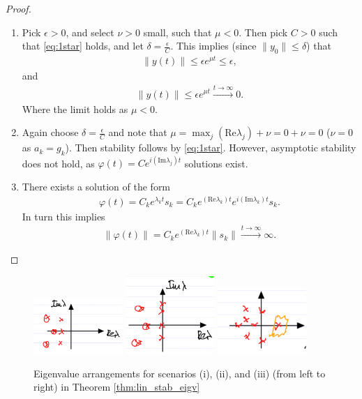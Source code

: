 \begin{proof}
	\begin{enumerate}
		\item Pick $\epsilon > 0$, and select $\nu > 0$ small, such that $\mu <0$. Then pick $C> 0$ such that \eqref{eq:1star} holds, and let $\delta = \frac{\epsilon}{C}$. This implies (since $\| {y} _0\| \leq \delta $) that
			\begin{align}
				\| {y} (t) \| \leq \epsilon e^{\mu t} \leq \epsilon,
			\end{align}
		and
		\begin{align}
			\| {y} (t) \| \leq \epsilon e^{\mu t} \xrightarrow{t \to \infty } 0. 
		\end{align}
	Where the limit holds as $\mu < 0$.	
\item Again choose $\delta = \frac{\epsilon}{C}$ and note that $\mu  = \max_{j} ( \textrm{Re} \lambda _j) + \nu = 0 + \nu =0$ ($\nu =0$ as $a_k = g_k$). Then stability follows by \eqref{eq:1star}. However, asymptotic stability does not hold, as $\varphi(t) = C e^{i ( \textrm{Im} \lambda _j)t} $ solutions exist.

\item There exists a solution of the form
	\begin{align}
		{	\varphi}(t) = C_k e^{\lambda _k t} {s} _k = C_k e^{( \textrm{Re}  \lambda _k)t} e ^{i ( \textrm{Im} \lambda _k)t}{s} _k.
	\end{align}
In turn this implies
\begin{align}
	\| {\varphi}(t) \| = C_k e^{( \textrm{Re} \lambda_k) t} \| {s} _k \| \xrightarrow{t \to \infty} \infty .
\end{align}

	\end{enumerate}
\end{proof}
\begin{figure}[h!]
	\centering
	\includegraphics[width=0.3\textwidth]{figures/ch2/8eigv_setup1.png}
	\includegraphics[width=0.3\textwidth]{figures/ch2/9eigv_setup2.png}
	\includegraphics[width=0.3\textwidth]{figures/ch2/10eigv_setup3.png}
	\caption{Eigenvalue arrangements for scenarios (i), (ii), and (iii) (from left to right) in Theorem \ref{thm:lin_stab_eigv}}
	\label{fig:eigv_setup}
\end{figure}

